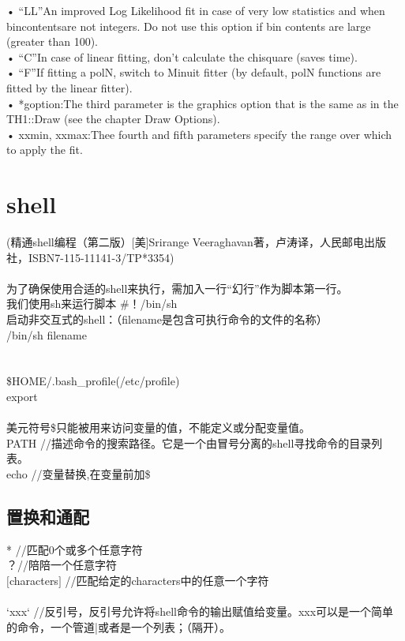 \documentclass[11pt,a4paper,titlepage]{article}
\begin{document}
{• “LL”An improved Log Likelihood fit in case of very low statistics and when bincontentsare not integers. Do not use this option if bin contents are large (greater than 100).\\
• “C”In case of linear fitting, don’t calculate the chisquare (saves time).\\
• “F”If fitting a polN, switch to Minuit fitter (by default, polN functions are fitted by the linear fitter).\\
• *goption:The third parameter is the graphics option that is the same as in the TH1::Draw (see the chapter Draw Options).\\
• xxmin, xxmax:Thee fourth and fifth parameters specify the range over which to apply the fit.\\

\section{shell}
(精通shell编程（第二版）[美]Srirange Veeraghavan著，卢涛译，人民邮电出版社，ISBN7-115-11141-3/TP*3354)\\
\\
为了确保使用合适的shell来执行，需加入一行“幻行”作为脚本第一行。\\
我们使用sh来运行脚本      \#！/bin/sh\\

启动非交互式的shell：（filename是包含可执行命令的文件的名称）\\
/bin/sh filename \\      
\\
\\
\$HOME/.bash\_profile(/etc/profile)\\
export     \\
\\
美元符号\$只能被用来访问变量的值，不能定义或分配变量值。\\
PATH   //描述命令的搜索路径。它是一个由冒号分离的shell寻找命令的目录列表。\\
echo  //变量替换,在变量前加\$\\

\subsection{\kai 置换和通配}
* //匹配0个或多个任意字符\\
？//陪陪一个任意字符\\
$[$characters$]$     //匹配给定的characters中的任意一个字符\\
\\
`xxx`     //反引号，反引号允许将shell命令的输出赋值给变量。xxx可以是一个简单的命令，一个管道|或者是一个列表；（隔开）。\\

}
\end{document}
